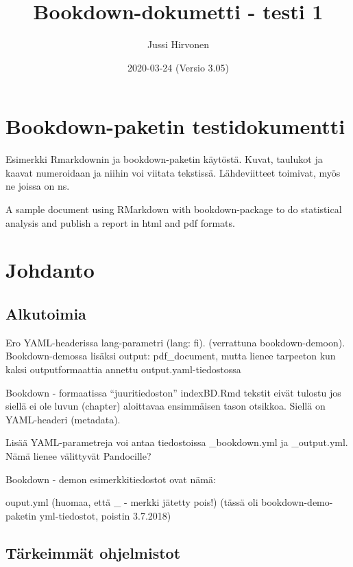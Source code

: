 \documentclass[
  finnish,
]{book}
\title{Bookdown-dokumetti - testi 1}
\author{Jussi Hirvonen}
\date{2020-03-24 (Versio 3.05)}
\begin{document}
\maketitle

{
\setcounter{tocdepth}{1}
\tableofcontents
}
\hypertarget{bookdown-paketin-testidokumentti}{%
\chapter{Bookdown-paketin testidokumentti}\label{bookdown-paketin-testidokumentti}}

Esimerkki Rmarkdownin ja bookdown-paketin käytöstä. Kuvat, taulukot ja kaavat numeroidaan ja niihin voi viitata tekstissä. Lähdeviitteet toimivat, myös ne joissa on ns.

A sample document using RMarkdown with bookdown-package to do statistical analysis and publish a report in html and pdf formats.

\hypertarget{johdanto}{%
\chapter{Johdanto}\label{johdanto}}

\hypertarget{alkutoimia}{%
\section{Alkutoimia}\label{alkutoimia}}

Ero YAML-headerissa lang-parametri (lang: fi). (verrattuna bookdown-demoon).
Bookdown-demossa lisäksi output: pdf\_document, mutta lienee tarpeeton kun kaksi outputformaattia annettu output.yaml-tiedostossa

Bookdown - formaatissa ``juuritiedoston'' indexBD.Rmd tekstit eivät tulostu jos siellä ei ole luvun (chapter) aloittavaa ensimmäisen tason otsikkoa. Siellä on YAML-headeri (metadata).

Lisää YAML-parametreja voi antaa tiedostoissa \_bookdown.yml ja \_output.yml. Nämä lienee välittyvät Pandocille?

Bookdown - demon esimerkkitiedostot ovat nämä:

ouput.yml (huomaa, että \_ - merkki jätetty pois!) (tässä oli bookdown-demo-paketin yml-tiedostot, poistin 3.7.2018)

\hypertarget{tuxe4rkeimmuxe4t-ohjelmistot}{%
\section{Tärkeimmät ohjelmistot}\label{tuxe4rkeimmuxe4t-ohjelmistot}}
\end{document}
